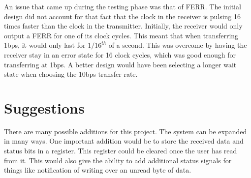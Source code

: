\documentclass[12pt, a4paper]{article}
\begin{document}
An issue that came up during the testing phase was that of FERR. The initial design did not account for that fact that
the clock in the receiver is pulsing 16 times faster than the clock in the transmitter. Initially, the receiver would
only output a FERR for one of its clock cycles. This meant that when transferring 1bps, it would only last for $1/16^{th}$
of a second. This was overcome by having the receiver stay in an error state for 16 clock cycles, which was good enough
for transferring at 1bps. A better design would have been selecting a longer wait state when choosing the 10bps transfer rate.

\section{Suggestions}
There are many possible additions for this project. The system can be expanded in many ways. One important addition would be
to store the received data and status bits in a register. This register could be cleared once the user has read from it. This
would also give the ability to add additional status signals for things like notification of writing over an unread byte of
data.
\end{document}
